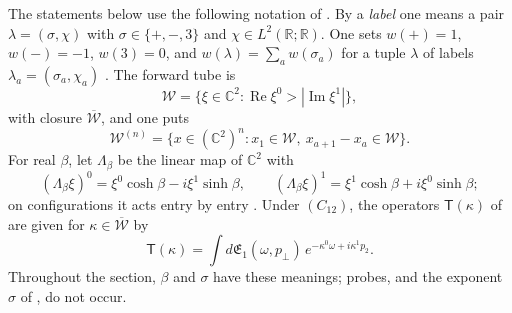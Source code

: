 \documentclass[11pt]{amsart}
\theoremstyle{definition}
\begin{document}
The statements below use the following notation of \cite{QEDII}.
By a \emph{label} one means a pair $\lambda=(\sigma,\chi)$ with $\sigma\in\{+,-,3\}$ and $\chi\in L^2(\mathbb R;\mathbb R)$.
One sets $w(+)=1$, $w(-)=-1$, $w(3)=0$, and $w(\lambda)=\sum_aw(\sigma_a)$ for a tuple $\lambda$ of labels $\lambda_a=(\sigma_a,\chi_a)$ \cite[Definition~14.5]{QEDII}.
The forward tube is
\begin{equation*}
\mathcal W=\{\xi\in\mathbb C^2:\operatorname{Re}\xi^0>|\operatorname{Im}\xi^1|\},
\end{equation*}
with closure $\overline{\mathcal W}$, and one puts
\begin{equation*}
\mathcal W^{(n)}=\{x\in(\mathbb C^2)^n:x_1\in\mathcal W,\ x_{a+1}-x_a\in\mathcal W\}.
\end{equation*}
For real $\beta$, let $\Lambda_\beta$ be the linear map of $\mathbb C^2$ with
\begin{equation*}
(\Lambda_\beta\xi)^0=\xi^0\cosh\beta-i\xi^1\sinh\beta,\qquad(\Lambda_\beta\xi)^1=\xi^1\cosh\beta+i\xi^0\sinh\beta;
\end{equation*}
on configurations it acts entry by entry \cite[Lemma~14.9\,(c)]{QEDII}.
Under $(C_{12})$, the operators $\mathsf T(\kappa)$ of \cite[Lemma~14.17]{QEDII} are given for $\kappa\in\overline{\mathcal W}$ by
\begin{equation*}
\mathsf T(\kappa)=\int d\mathfrak E_1(\omega,p_\perp)\,e^{-\kappa^0\omega+i\kappa^1p_2}.
\end{equation*}
Throughout the section, $\beta$ and $\sigma$ have these meanings; probes, and the exponent $\sigma$ of \cite{QEDIII}, do not occur.
\end{document}

